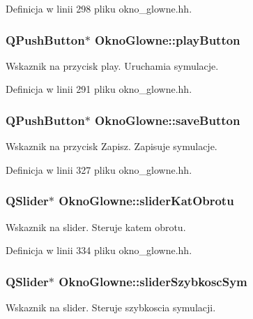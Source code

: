 Definicja w linii 298 pliku okno\-\_\-glowne.\-hh.

\hypertarget{class_okno_glowne_a50f936486c1bc3b3278823a8eb90841e}{
\subsubsection[{play\-Button}]{\setlength{\rightskip}{0pt plus 5cm}Q\-Push\-Button$\ast$ Okno\-Glowne\-::play\-Button\hspace{0.3cm}{\ttfamily [private]}}}\label{class_okno_glowne_a50f936486c1bc3b3278823a8eb90841e}
Wskaznik na przycisk play. Uruchamia symulacje. 

Definicja w linii 291 pliku okno\-\_\-glowne.\-hh.

\hypertarget{class_okno_glowne_a81e6650fa592f04bf0adc3bebd3346d6}{
\subsubsection[{save\-Button}]{\setlength{\rightskip}{0pt plus 5cm}Q\-Push\-Button$\ast$ Okno\-Glowne\-::save\-Button\hspace{0.3cm}{\ttfamily [private]}}}\label{class_okno_glowne_a81e6650fa592f04bf0adc3bebd3346d6}
Wskaznik na przycisk Zapisz. Zapisuje symulacje. 

Definicja w linii 327 pliku okno\-\_\-glowne.\-hh.

\hypertarget{class_okno_glowne_aaee43ea7074cff126b069c60657d698d}{
\subsubsection[{slider\-Kat\-Obrotu}]{\setlength{\rightskip}{0pt plus 5cm}Q\-Slider$\ast$ Okno\-Glowne\-::slider\-Kat\-Obrotu\hspace{0.3cm}{\ttfamily [private]}}}\label{class_okno_glowne_aaee43ea7074cff126b069c60657d698d}
Wskaznik na slider. Steruje katem obrotu. 

Definicja w linii 334 pliku okno\-\_\-glowne.\-hh.

\hypertarget{class_okno_glowne_a85328893065393400d5a0344004ca78b}{
\subsubsection[{slider\-Szybkosc\-Sym}]{\setlength{\rightskip}{0pt plus 5cm}Q\-Slider$\ast$ Okno\-Glowne\-::slider\-Szybkosc\-Sym\hspace{0.3cm}{\ttfamily [private]}}}\label{class_okno_glowne_a85328893065393400d5a0344004ca78b}
Wskaznik na slider. Steruje szybkoscia symulacji. 

